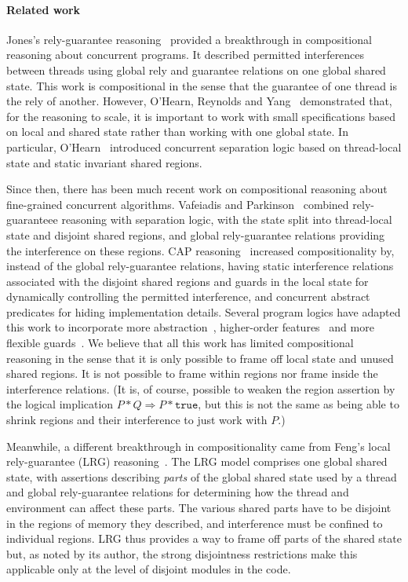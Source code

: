 \paragraph{Related work}
Jones's rely-guarantee reasoning~\cite{rg} provided a breakthrough in
compositional reasoning about concurrent programs. It described
permitted interferences between threads using global rely and
guarantee relations on one  global shared state. This work is
compositional in the sense that the guarantee of one thread is the
rely of another. However, O'Hearn, Reynolds and
Yang~\cite{o2001local} demonstrated that, for the
reasoning to scale, it is important to work with small specifications
based on local and shared state rather than working with one
global state. In particular, O'Hearn~\cite{csl-tcs} introduced concurrent
separation logic based on thread-local state and static invariant
shared regions.


Since then, there has been much recent work on compositional
reasoning about fine-grained concurrent algorithms. Vafeiadis and
Parkinson~\cite{viktor-marriage} combined rely-guaranteee reasoning with
separation logic, with the state split into thread-local state and
disjoint shared regions, and global rely-guarantee relations providing
the interference on these regions. 
CAP reasoning~\cite{cap-ecoop10} increased  compositionality by, instead of the
global
rely-guarantee relations, having static interference relations
associated with the disjoint shared regions and guards in the local
state for dynamically controlling the permitted  interference, and concurrent
abstract predicates for hiding implementation details. Several
program logics have adapted this work to incorporate more
abstraction~\cite{caresl}, higher-order features~\cite{icap} and more flexible
guards~\cite{tada}. We believe that all  this work has  limited compositional
reasoning in the sense that it is only possible to frame off local
state and unused shared regions. It is not possible to 
frame within regions nor frame inside the interference
relations.  (It is, of course, possible to weaken the region assertion
by the logical implication $P * Q \Rightarrow P * \texttt{true}$, but this is
not the same as being able to shrink regions and their interference to
just work with $P$.)

Meanwhile, a different breakthrough in compositionality came from
Feng's local rely-guarantee (LRG) reasoning~\cite{lrg}. The LRG model
comprises one global shared state, with assertions describing {\em
  parts} of the global shared state used by a thread and global
rely-guarantee relations for determining how the thread and
environment can affect these parts. The various shared parts have to
be disjoint in the regions of memory they described, and interference
must be confined to individual regions. LRG thus provides a way to
frame off parts of the shared state but, as noted by its author, the
strong disjointness restrictions make this applicable only at the
level of disjoint modules in the code.

